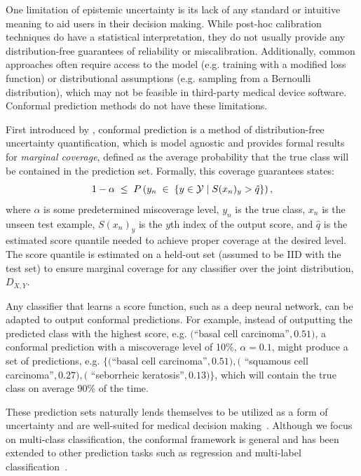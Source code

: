 \documentclass[letterpaper]{article} %
\begin{document}
        One limitation of epistemic uncertainty is its lack of any standard or intuitive meaning to aid users in their decision making.
        While post-hoc calibration techniques do have a statistical interpretation, they do not usually provide any distribution-free guarantees of reliability or miscalibration.
        Additionally, common approaches often require access to the model (e.g. training with a modified loss function) or distributional assumptions (e.g. sampling from a Bernoulli distribution), which may not be feasible in third-party medical device software.
        Conformal prediction methods do not have these limitations.

        First introduced by \citet{vovk}, conformal prediction is a method of distribution-free uncertainty quantification, which is model agnostic and provides formal results for \textit{marginal coverage}, defined as the average probability that the true class will be contained in the prediction set.
        Formally, this coverage guarantees states:
        \begin{equation}
            \small
            1 - \alpha \; \leq \; P\left(y_n \; \in \; \left\{y \in \mathcal{Y} \mid S(x_n)_y > \hat{q} \right\} \right),
        \end{equation}
        where $\alpha$ is some predetermined miscoverage level, $y_n$ is the true class, $x_n$ is the unseen test example, $S(x_n)_y$ is the $y$th index of the output score, and $\hat{q}$ is the estimated score quantile needed to achieve proper coverage at the desired level.
        The score quantile is estimated on a held-out set (assumed to be IID with the test set) to ensure marginal coverage for any classifier over the joint distribution, $D_{X, Y}$.


        Any classifier that learns a score function, such as a deep neural network, can be adapted to output conformal predictions.
        For example, instead of outputting the predicted class with the highest score, e.g. $($``basal cell carcinoma''$, 0.51)$, a conformal prediction with a miscoverage level of 10\%, $\alpha=0.1$, might produce a set of predictions, e.g. $\{($``basal cell carcinoma''$, 0.51), ($ ``squamous cell carcinoma''$, 0.27), ($ ``seborrheic keratosis''$, 0.13)\}$, which will contain the true class on average 90\% of the time.

        These prediction sets naturally lends themselves to be utilized as a form of uncertainty and are well-suited for medical decision making~\cite{kompa,10.1007/s41666-021-00113-8}.
        Although we focus on multi-class classification, the conformal framework is general and has been extended to other prediction tasks such as regression and multi-label classification~\cite{NEURIPS2019_5103c358,JMLR:v22:20-753}.
\end{document}
